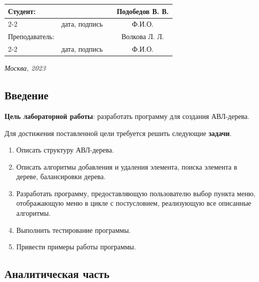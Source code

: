 \documentclass[12pt, a4paper]{article}
\begin{document}
\begin{titlepage}
  \fontsize{14}{21}\selectfont
  \vspace{5cm}


  \noindent\begin{tabularx}{\textwidth}{ X >{\centering}p{4cm} p{1cm} c }
   Студент: & & & Подобедов В. В. \\ \cline{2-2} \cline{4-4}
   & \fontsize{10}{15}\selectfont дата, подпись & & \fontsize{10}{15}\selectfont Ф.И.О. \\
   Преподаватель: & & & Волкова Л. Л.\\ \cline{2-2} \cline{4-4}
   & \fontsize{10}{15}\selectfont дата, подпись & & \fontsize{10}{15}\selectfont Ф.И.О.
  \end{tabularx}

  \vspace{\fill}

  \begin{center}
   \it{Москва}, 2023
  \end{center}

  \thispagestyle{empty}
\end{titlepage}

\renewcommand{\contentsname}{Содержание}
\setcounter{page}{2}
\tableofcontents

\newpage
\begin{center}
   \section*{Введение} 
\end{center}
\justifying
\textbf{Цель лабораторной работы}: разработать программу для создания АВЛ-дерева.

Для достижения поставленной цели требуется решить следующие \textbf{задачи}.
\begin{enumerate}
\item Описать структуру АВЛ-дерева.
\item Описать алгоритмы добавления и удаления элемента, поиска элемента в дереве, балансировки дерева.
\item Разработать программу, предоставляющую пользователю выбор пункта меню, отображающую меню в цикле с постусловием, реализующую все описанные алгоритмы.
\item Выполнить тестирование программы.
\item Привести примеры работы программы.
\end{enumerate}

\newpage
\begin{center}
   \section{Аналитическая часть} 
\end{center}
\end{document}
